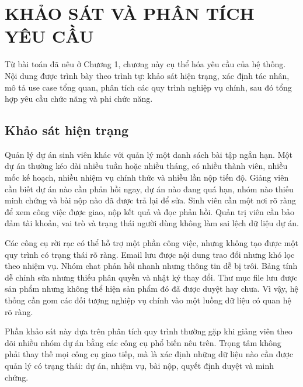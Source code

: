 \chapter{KHẢO SÁT VÀ PHÂN TÍCH YÊU CẦU}

Từ bài toán đã nêu ở Chương 1, chương này cụ thể hóa yêu cầu của hệ thống. Nội dung được trình bày theo trình tự: khảo sát hiện trạng, xác định tác nhân, mô tả use case tổng quan, phân tích các quy trình nghiệp vụ chính, sau đó tổng hợp yêu cầu chức năng và phi chức năng.

\section{Khảo sát hiện trạng}

Quản lý dự án sinh viên khác với quản lý một danh sách bài tập ngắn hạn. Một dự án thường kéo dài nhiều tuần hoặc nhiều tháng, có nhiều thành viên, nhiều mốc kế hoạch, nhiều nhiệm vụ chính thức và nhiều lần nộp tiến độ. Giảng viên cần biết dự án nào cần phản hồi ngay, dự án nào đang quá hạn, nhóm nào thiếu minh chứng và bài nộp nào đã được trả lại để sửa. Sinh viên cần một nơi rõ ràng để xem công việc được giao, nộp kết quả và đọc phản hồi. Quản trị viên cần bảo đảm tài khoản, vai trò và trạng thái người dùng không làm sai lệch dữ liệu dự án.

Các công cụ rời rạc có thể hỗ trợ một phần công việc, nhưng không tạo được một quy trình có trạng thái rõ ràng. Email lưu được nội dung trao đổi nhưng khó lọc theo nhiệm vụ. Nhóm chat phản hồi nhanh nhưng thông tin dễ bị trôi. Bảng tính dễ chỉnh sửa nhưng thiếu phân quyền và nhật ký thay đổi. Thư mục file lưu được sản phẩm nhưng không thể hiện sản phẩm đó đã được duyệt hay chưa. Vì vậy, hệ thống cần gom các đối tượng nghiệp vụ chính vào một luồng dữ liệu có quan hệ rõ ràng.

Phần khảo sát này dựa trên phân tích quy trình thường gặp khi giảng viên theo dõi nhiều nhóm dự án bằng các công cụ phổ biến nêu trên. Trọng tâm không phải thay thế mọi công cụ giao tiếp, mà là xác định những dữ liệu nào cần được quản lý có trạng thái: dự án, nhiệm vụ, bài nộp, quyết định duyệt và minh chứng.


